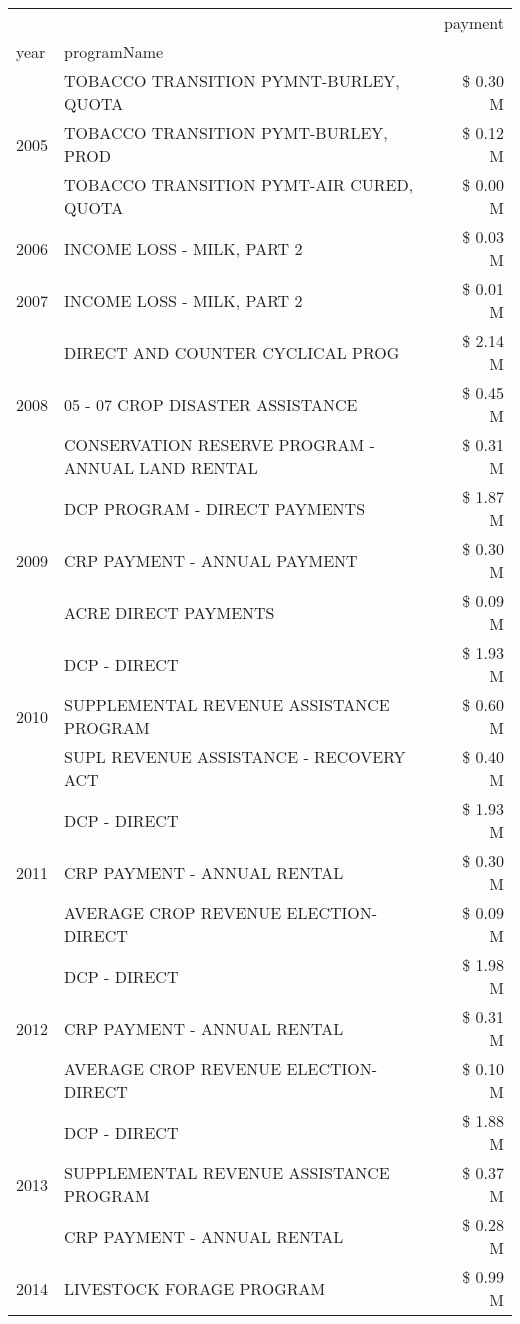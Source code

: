 \begin{tabular}{llr}
\toprule
 &  & payment \\
year & programName &  \\
\midrule
\multirow[t]{3}{*}{2005} & TOBACCO TRANSITION PYMNT-BURLEY, QUOTA & \$ 0.30 M \\
 & TOBACCO TRANSITION PYMT-BURLEY, PROD & \$ 0.12 M \\
 & TOBACCO TRANSITION PYMT-AIR CURED, QUOTA & \$ 0.00 M \\
\cline{1-3}
2006 & INCOME LOSS - MILK, PART 2 & \$ 0.03 M \\
\cline{1-3}
2007 & INCOME LOSS - MILK, PART 2 & \$ 0.01 M \\
\cline{1-3}
\multirow[t]{3}{*}{2008} & DIRECT AND COUNTER CYCLICAL PROG & \$ 2.14 M \\
 & 05 - 07 CROP DISASTER ASSISTANCE & \$ 0.45 M \\
 & CONSERVATION RESERVE PROGRAM - ANNUAL LAND RENTAL & \$ 0.31 M \\
\cline{1-3}
\multirow[t]{3}{*}{2009} & DCP PROGRAM - DIRECT PAYMENTS & \$ 1.87 M \\
 & CRP PAYMENT - ANNUAL PAYMENT & \$ 0.30 M \\
 & ACRE DIRECT PAYMENTS & \$ 0.09 M \\
\cline{1-3}
\multirow[t]{3}{*}{2010} & DCP - DIRECT & \$ 1.93 M \\
 & SUPPLEMENTAL REVENUE ASSISTANCE PROGRAM & \$ 0.60 M \\
 & SUPL REVENUE ASSISTANCE - RECOVERY ACT & \$ 0.40 M \\
\cline{1-3}
\multirow[t]{3}{*}{2011} & DCP - DIRECT & \$ 1.93 M \\
 & CRP PAYMENT - ANNUAL RENTAL & \$ 0.30 M \\
 & AVERAGE CROP REVENUE ELECTION-DIRECT & \$ 0.09 M \\
\cline{1-3}
\multirow[t]{3}{*}{2012} & DCP - DIRECT & \$ 1.98 M \\
 & CRP PAYMENT - ANNUAL RENTAL & \$ 0.31 M \\
 & AVERAGE CROP REVENUE ELECTION-DIRECT & \$ 0.10 M \\
\cline{1-3}
\multirow[t]{3}{*}{2013} & DCP - DIRECT & \$ 1.88 M \\
 & SUPPLEMENTAL REVENUE ASSISTANCE PROGRAM & \$ 0.37 M \\
 & CRP PAYMENT - ANNUAL RENTAL & \$ 0.28 M \\
\cline{1-3}
\multirow[t]{3}{*}{2014} & LIVESTOCK FORAGE PROGRAM & \$ 0.99 M \\

\end{tabular}
